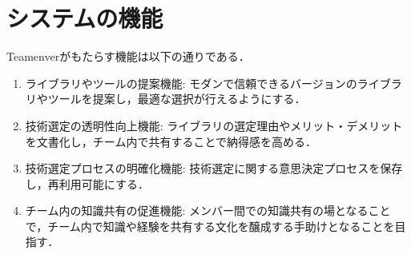 \documentclass[main]{subfiles}
\begin{document}
\section{システムの機能}
Teamenverがもたらす機能は以下の通りである．
\begin{enumerate}
\item ライブラリやツールの提案機能: モダンで信頼できるバージョンのライブラリやツールを提案し，最適な選択が行えるようにする．

\item 技術選定の透明性向上機能: ライブラリの選定理由やメリット・デメリットを文書化し，チーム内で共有することで納得感を高める．

\item 技術選定プロセスの明確化機能: 技術選定に関する意思決定プロセスを保存し，再利用可能にする．

\item チーム内の知識共有の促進機能: メンバー間での知識共有の場となることで，チーム内で知識や経験を共有する文化を醸成する手助けとなることを目指す．
\end{enumerate}
\end{document}
